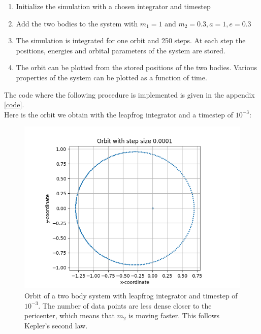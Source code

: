 \documentclass[12pt,a4paper]{article}
\begin{document}
\begin{enumerate}
  \item Initialize the simulation with a chosen integrator and timestep
  \item Add the two bodies to the system with $m_1 = 1$ and $m_2 = 0.3, a=1, e=0.3 $
  \item The simulation is integrated for one orbit and 250 steps. At each step the positions, energies and orbital parameters of the system are stored.
  \item The orbit can be plotted from the stored positions of the two bodies. Various properties of the system can be plotted as a function of time.
\end{enumerate}
The code where the following procedure is implemented is given in the appendix \ref{code}.\\
Here is the orbit we obtain with the leapfrog integrator and a timestep of $10^{-3}$:
\begin{figure}[H]
  \centering
  \includegraphics[width=\textwidth]{2Body/2BD0.png}
  \caption{Orbit of a two body system with leapfrog integrator and timestep of $10^{-3}$. The number of data points are less dense closer to the pericenter, which means that $m_2$ is moving faster. This follows Kepler's second law.}
  \label{fig:leapfrog_1e-3}
\end{figure}
\end{document}
